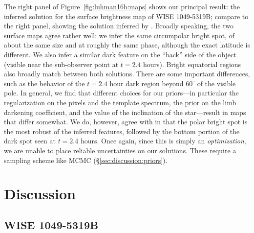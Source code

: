 \documentclass[modern]{aastex631}
\begin{document}
The right panel of Figure~\ref{fig:luhman16b:maps} shows our principal result: the inferred solution for the surface brightness map of WISE 1049-5319B; compare to the right panel, showing the solution inferred by \citet{Crossfield2014}.
Broadly speaking, the two surface maps agree rather well: we infer the same circumpolar bright spot, of about the same size and at roughly the same phase, although the exact latitude is different.
We also infer a similar dark feature on the ``back'' side of the object (visible near the sub-observer point at $t = 2.4$ hours).
Bright equatorial regions also broadly match between both solutions.
There are some important differences, such as the behavior of the $t = 2.4$ hour dark region beyond $60^\circ$ of the visible pole.
In general, we find that different choices for our priors---in particular the regularization on the pixels and the template spectrum, the prior on the limb darkening coefficient, and the value of the inclination of the star---result in maps that differ somewhat.
We do, however, agree with \citet{Crossfield2014} in that the polar bright spot is the most robust of the inferred features, followed by the bottom portion of the dark spot seen at $t = 2.4$ hours.
Once again, since this is simply an \emph{optimization}, we are unable to place reliable uncertainties on our solutions.
These require a sampling scheme like MCMC (\S\ref{sec:discussion:priors}).


\section{Discussion}
\label{sec:discussion}
%

\subsection{WISE 1049-5319B}
\label{sec:discussion:luhman}
\end{document}

